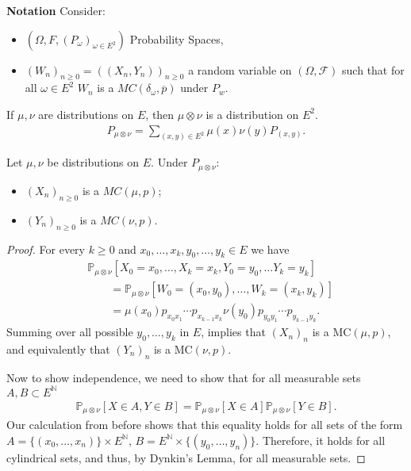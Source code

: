 \noindent
\textbf{Notation} Consider:
\begin{itemize}
	\item $(\Omega, F, (P_\omega)_{\omega \in E^2})$ Probability Spaces,
	\item $(W_n)_{n\geq 0}=((X_n,Y_n))_{n\geq 0}$ a random variable on $(\Omega, \mathcal{F})$ such that for all $\omega \in E^2$ $W_n$ is a $MC(\delta_\omega, \overline{p})$ under $P_w$.
\end{itemize}

\begin{rmk}[]
	If $\mu, \nu $ are distributions on $E$, then $\mu \otimes \nu $ is a distribution on $E^2$.
	\begin{align}
		\boxed{P_{\mu \otimes \nu }= \sum_{(x,y)\in E^2}^{}\mu (x) \nu (y) P_{(x,y)}}.
	\end{align}
	
\end{rmk}

\begin{prop}[]
	Let $\mu,\nu $ be distributions on $E$. Under $P_{\mu \otimes \nu }:$ 
\begin{itemize}
	\item $(X_n)_{n\geq 0}$ is a $MC(\mu ,p)$;
	\item $(Y_n)_{n\geq 0}$ is a $MC(\nu ,p)$.
\end{itemize}
\end{prop}
\begin{proof}
	For every $k\geq 0$ and $x_0,\ldots,x_k, y_0, \ldots, y_k \in E$ we have
\begin{align}
&	\mathbb{P}_{\mu \otimes \nu } \left[ X_0 = x_0, \ldots, X_k=x_k, Y_0 = y_0, \ldots Y_k = y_k \right] \\
&\qquad= \mathbb{P}_{\mu \otimes \nu } \left[ W_0=(x_0, y_0), \ldots, W_k = (x_k, y_k) \right] \\
&\qquad= \mu (x_0) p_{x_0x_1}\cdots p_{x_{k-1}x_k} \nu (y_0) p_{y_0 y_1} \cdots p_{y_{k-1}y_k}
.	\end{align}
Summing over all possible $y_0,\ldots , y_k$ in $E$, implies that $(X_n)_{n}$ is a MC$(\mu ,p)$, and equivalently that $(Y_n)_{n}$ is a MC$(\nu ,p)$.	

Now to show independence, we need to show that for all measurable sets $A,B \subset E^{\mathbb{N}}$ 
\begin{align}
	\mathbb{P}_{\mu \otimes \nu } \left[ X \in A, Y\in B \right] = \mathbb{P}_{\mu \otimes \nu } \left[ X \in A \right] \mathbb{P}_{\mu \otimes \nu } \left[ Y \in B \right].
\end{align}
Our calculation from before shows that this equality holds for all sets of the form $A = \{(x_0,\ldots,x_n)\} \times E^{\mathbb{N}}$, $B=E^{\mathbb{N}}\times \{(y_0,\ldots , y_n)\}$. Therefore, it holds for all cylindrical sets, and thus, by Dynkin's Lemma, for all measurable sets.
\end{proof}



